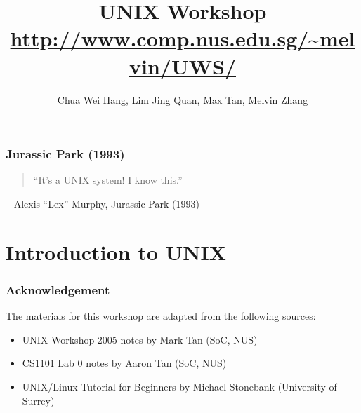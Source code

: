 \usepackage{graphicx} 
\usepackage{verbatim}
\usepackage{hyperref}
\hypersetup{
    colorlinks,%
    citecolor=black,%
    filecolor=black,%
    linkcolor=black,%
    urlcolor=blue
}

\graphicspath{{../figures/}}


\newcommand{\ftitle}[1]{\frametitle<presentation>{#1}}
\newcommand{\cmd}[1]{\begin{quote}{\tt #1}\end{quote}}

\title{UNIX Workshop\\\url{http://www.comp.nus.edu.sg/~melvin/UWS/}}
\author{Chua Wei Hang, Lim Jing Quan, Max Tan, Melvin Zhang}






\maketitle



\begin{frame}
\ftitle{Jurassic Park (1993)}
\begin{quote}
``It's a UNIX system! I know this.''
\end{quote}
\begin{flushright}
-- Alexis ``Lex'' Murphy, Jurassic Park (1993)
\end{flushright}
\end{frame}


\section{Introduction to UNIX}
\begin{frame}
\ftitle{Acknowledgement}
The materials for this workshop are adapted from the following sources:
\begin{itemize}
\item UNIX Workshop 2005 notes by Mark Tan (SoC, NUS)
\item CS1101 Lab 0 notes by Aaron Tan (SoC, NUS)
\item UNIX/Linux Tutorial for Beginners by Michael Stonebank (University of Surrey)
\end{itemize}
\end{frame}

